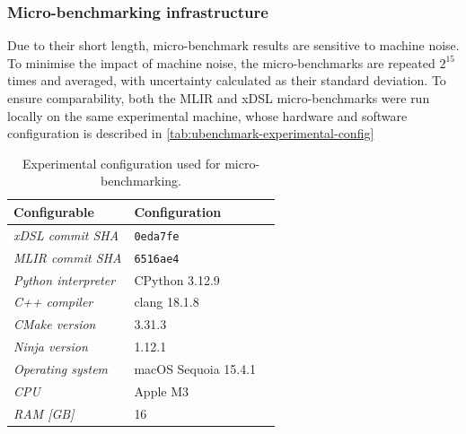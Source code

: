 \subsubsection{Micro-benchmarking infrastructure}
\label{sssec:ubenchmark-methodology-infra}

Due to their short length, micro-benchmark results are sensitive to machine noise.
To minimise the impact of machine noise, the micro-benchmarks are repeated $2^{15}$ times and averaged, with uncertainty calculated as their standard deviation. To ensure comparability, both the MLIR and xDSL micro-benchmarks were run locally on the same experimental machine, whose hardware and software configuration is described in \autoref{tab:ubenchmark-experimental-config}

\begin{table}[H]
  \caption{Experimental configuration used for micro-benchmarking.}
  \label{tab:ubenchmark-experimental-config}
  \centering
  \begin{tabular}{lll}
    \toprule
    \textbf{Configurable} & \textbf{Configuration} \\
    \midrule
    \textit{xDSL commit SHA} & \texttt{0eda7fe} \\
    \textit{MLIR commit SHA} & \texttt{6516ae4} \\
    \midrule
    \textit{Python interpreter} & CPython 3.12.9 \\
    \textit{C++ compiler} & clang 18.1.8 \\
    \textit{CMake version} & 3.31.3 \\
    \textit{Ninja version} & 1.12.1 \\
    \textit{Operating system} & macOS Sequoia 15.4.1 \\
    \midrule
    \textit{CPU} & Apple M3 \\
    \textit{RAM [GB]} & 16 \\
    \bottomrule
  \end{tabular}
\end{table}

